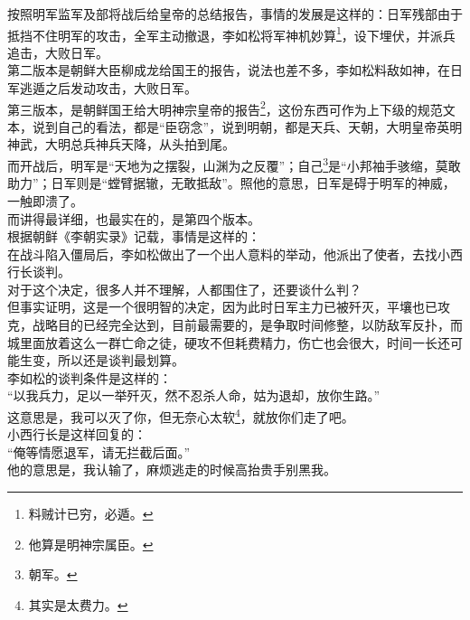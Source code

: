 \begin{multicols}{\theparacolNo}
按照明军监军及部将战后给皇帝的总结报告，事情的发展是这样的：日军残部由于抵挡不住明军的攻击，全军主动撤退，李如松将军神机妙算\footnote{料贼计已穷，必遁。}，设下埋伏，并派兵追击，大败日军。\\

第二版本是朝鲜大臣柳成龙给国王的报告，说法也差不多，李如松料敌如神，在日军逃遁之后发动攻击，大败日军。\\

第三版本，是朝鲜国王给大明神宗皇帝的报告\footnote{他算是明神宗属臣。}，这份东西可作为上下级的规范文本，说到自己的看法，都是“臣窃念”，说到明朝，都是天兵、天朝，大明皇帝英明神武，大明总兵神兵天降，从头拍到尾。\\

而开战后，明军是“天地为之摆裂，山渊为之反覆”；自己\footnote{朝军。}是“小邦袖手骇缩，莫敢助力”；日军则是“螳臂据辙，无敢抵敌”。照他的意思，日军是碍于明军的神威，一触即溃了。\\

而讲得最详细，也最实在的，是第四个版本。\\

根据朝鲜《李朝实录》记载，事情是这样的：\\

在战斗陷入僵局后，李如松做出了一个出人意料的举动，他派出了使者，去找小西行长谈判。\\

对于这个决定，很多人并不理解，人都围住了，还要谈什么判？\\

但事实证明，这是一个很明智的决定，因为此时日军主力已被歼灭，平壤也已攻克，战略目的已经完全达到，目前最需要的，是争取时间修整，以防敌军反扑，而城里面放着这么一群亡命之徒，硬攻不但耗费精力，伤亡也会很大，时间一长还可能生变，所以还是谈判最划算。\\

李如松的谈判条件是这样的：\\

“以我兵力，足以一举歼灭，然不忍杀人命，姑为退却，放你生路。”\\

这意思是，我可以灭了你，但无奈心太软\footnote{其实是太费力。}，就放你们走了吧。\\

小西行长是这样回复的：\\

“俺等情愿退军，请无拦截后面。”\\

他的意思是，我认输了，麻烦逃走的时候高抬贵手别黑我。\\


\end{multicols}

